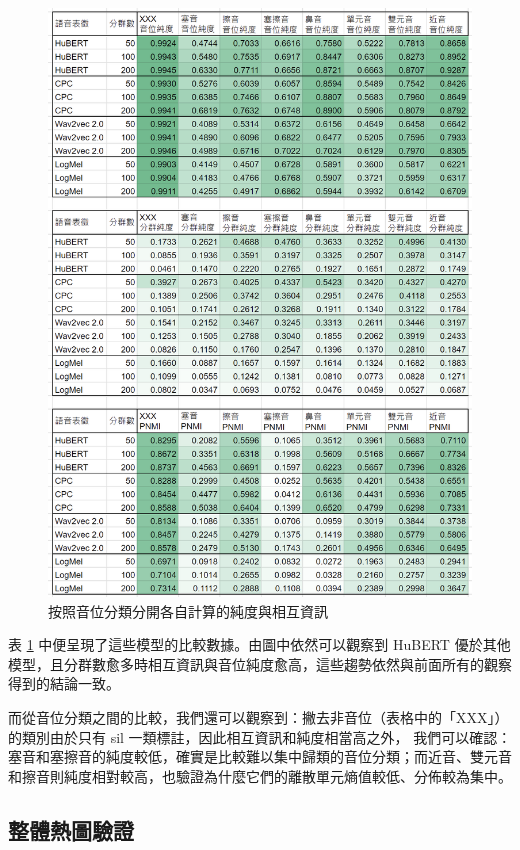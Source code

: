 \begin{figure}
    \centering
    \includegraphics[width=1\linewidth]{figures/pur-of-each-cls-xls.png}
     \caption{按照音位分類分開各自計算的純度與相互資訊}
     \label{fig:pur-of-each-cls}
\end{figure}


        表 \ref{fig:pur-of-each-cls} 中便呈現了這些模型的比較數據。由圖中依然可以觀察到 HuBERT 優於其他模型，且分群數愈多時相互資訊與音位純度愈高，這些趨勢依然與前面所有的觀察得到的結論一致。

而從音位分類之間的比較，我們還可以觀察到：撇去非音位（表格中的「XXX」）的類別由於只有 sil 一類標註，因此相互資訊和純度相當高之外，
我們可以確認：塞音和塞擦音的純度較低，確實是比較難以集中歸類的音位分類；而近音、雙元音和擦音則純度相對較高，也驗證為什麼它們的離散單元熵值較低、分佈較為集中。

\subsection{整體熱圖驗證}


